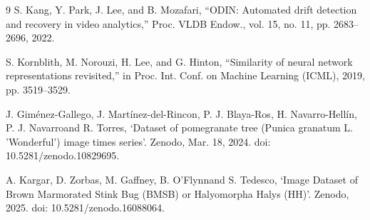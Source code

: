 \documentclass[journal]{IEEEtran} %
\begin{document}
\begin{thebibliography}{9}
S. Kang, Y. Park, J. Lee, and B. Mozafari,
“ODIN: Automated drift detection and recovery in video analytics,”
Proc. VLDB Endow., vol. 15, no. 11, pp. 2683–2696, 2022.

S. Kornblith, M. Norouzi, H. Lee, and G. Hinton,
“Similarity of neural network representations revisited,”
in Proc. Int. Conf. on Machine Learning (ICML),
2019, pp. 3519–3529.

J. Giménez-Gallego, J. Martínez-del-Rincon, P. J. Blaya-Ros, H. Navarro-Hellín, P. J. Navarroand R. Torres, ‘Dataset of pomegranate tree (Punica granatum L. 'Wonderful') image times series’. Zenodo, Mar. 18, 2024. doi: 10.5281/zenodo.10829695.

A. Kargar, D. Zorbas, M. Gaffney, B. O'Flynnand S. Tedesco, ‘Image Dataset of Brown Marmorated Stink Bug (BMSB) or Halyomorpha Halys (HH)’. Zenodo, 2025. doi: 10.5281/zenodo.16088064.



\end{thebibliography}
\end{document}
